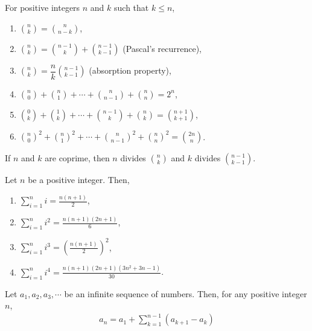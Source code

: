 \documentclass[main.tex]{subfile}
\begin{document}
\begin{appendix}
	\begin{identity} \label{thm:binom}
		For positive integers $n$ and $k$ such that $k \leq n$,
		\begin{enumerate}
			\item $\displaystyle\binom{n}{k}=\binom{n}{n-k}$,
			\item $\displaystyle\binom{n}{k}=\binom{n-1}k+\binom{n-1}{k-1}$ (Pascal's recurrence),
			\item $\displaystyle\binom{n}{k}=\dfrac{n}{k}\binom{n-1}{k-1}$ (absorption property), \label{id:binomreduction}
			\item $\displaystyle\binom{n}{0}+\binom{n}{1}+\cdots+\binom{n}{n-1}+\binom{n}{n} = 2^n$,
			\item $\displaystyle \binom{0}{k} + \binom{1}{k} + \cdots +\binom{n-1}{k} + \binom{n}{k} = \binom{n+1}{k+1}$,
			\item $\displaystyle\binom{n}0^2+\binom{n}{1}^2+\cdots+\binom{n}{n-1}^2+\binom{n}{n}^2 = \binom{2n}{n}$. \label{id:binomsquaressum}
		\end{enumerate}
	\end{identity}

	\begin{identity}
		If $n$ and $k$ are coprime, then $n$ divides $\binom nk$ and $k$ divides $\binom{n-1}{k-1}$.
	\end{identity}

	\begin{identity}\label{id:sumofpowers}
		Let $n$ be a positive integer. Then,
			\begin{enumerate}
				\item $\displaystyle\sum\limits_{i=1}^{n} i = \frac{n(n+1)}{2}$,
				\item $\displaystyle\sum\limits_{i=1}^{n} i^2 = \frac{n(n+1)(2n+1)}{6}$,
				\item $\displaystyle\sum\limits_{i=1}^{n} i^3 = \left(\frac{n(n+1)}{2}\right)^2$,
				\item $\displaystyle\sum\limits_{i=1}^{n} i^4 = \frac{n(n+1)(2n+1)(3n^2+3n-1)}{30}$.
			\end{enumerate}
	\end{identity}

	\begin{identity}\label{id:sumofdif}
		Let $a_1, a_2, a_3, \cdots$ be an infinite sequence of numbers. Then, for any positive integer $n$,
			\begin{align*}
				a_n  = a_1 + \sum_{k=1}^{n-1} \left(a_{k+1} - a_{k}\right)
			\end{align*}
	\end{identity}


\end{appendix}
\end{document}

